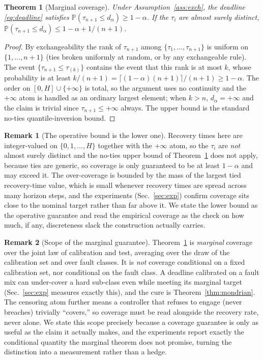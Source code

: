 \documentclass[11pt]{article}
\theoremstyle{plain}
\newtheorem{theorem}{Theorem}
\theoremstyle{definition}
\newtheorem{remark}{Remark}
\newcommand{\Prob}{\mathbb{P}}
\newcommand{\dalpha}{d_{\alpha}}
\begin{document}
\begin{theorem}[Marginal coverage]
\label{thm:marginal}
Under Assumption~\ref{ass:exch}, the deadline \eqref{eq:deadline} satisfies
$\Prob(\tau_{n+1} \le \dalpha) \ge 1-\alpha$. If the $\tau_i$ are almost surely distinct,
$\Prob(\tau_{n+1}\le\dalpha) \le 1-\alpha + 1/(n+1)$.
\end{theorem}
\begin{proof}
By exchangeability the rank of $\tau_{n+1}$ among $\{\tau_1,\dots,\tau_{n+1}\}$ is uniform
on $\{1,\dots,n+1\}$ (ties broken uniformly at random, or by any exchangeable rule). The
event $\{\tau_{n+1}\le \tau_{(k)}\}$ contains the event that this rank is at most $k$, whose
probability is at least $k/(n+1) = \lceil(1-\alpha)(n+1)\rceil/(n+1) \ge 1-\alpha$. The
order on $[0,H]\cup\{+\infty\}$ is total, so the argument uses no continuity and the
$+\infty$ atom is handled as an ordinary largest element; when $k>n$, $\dalpha=+\infty$ and
the claim is trivial since $\tau_{n+1}\le+\infty$ always. The upper bound is the standard
no-ties quantile-inversion bound.
\end{proof}

\begin{remark}[The operative bound is the lower one]
\label{rem:discrete}
Recovery times here are integer-valued on $\{0,1,\dots,H\}$ together with the $+\infty$ atom,
so the $\tau_i$ are \emph{not} almost surely distinct and the no-ties upper bound of
Theorem~\ref{thm:marginal} does not apply, because ties are generic, so coverage is only
guaranteed to be at least $1-\alpha$ and may exceed it. The over-coverage is bounded by the
mass of the largest tied recovery-time value, which is small whenever recovery times are
spread across many horizon steps, and the experiments (Sec.~\ref{sec:exp}) confirm coverage
sits close to the nominal target rather than far above it. We state the lower bound as the
operative guarantee and read the empirical coverage as the check on how much, if any,
discreteness slack the construction actually carries.
\end{remark}

\begin{remark}[Scope of the marginal guarantee]
\label{rem:marginal}
Theorem~\ref{thm:marginal} is \emph{marginal} coverage over the joint law of calibration
and test, averaging over the draw of the calibration set and over fault classes. It is
\emph{not} coverage conditional on a fixed calibration set, nor conditional on the fault
class. A deadline calibrated on a fault mix can under-cover a hard sub-class even while
meeting its marginal target (Sec.~\ref{sec:exp} measures exactly this), and the cure is
Theorem~\ref{thm:mondrian}. The censoring atom further means a controller that refuses to
engage (never breaches) trivially ``covers,'' so coverage must be read alongside the
recovery rate, never alone. We state this scope precisely because a coverage guarantee is
only as useful as the claim it actually makes, and the experiments report exactly the
conditional quantity the marginal theorem does not promise, turning the distinction into a
measurement rather than a hedge.
\end{remark}
\end{document}
